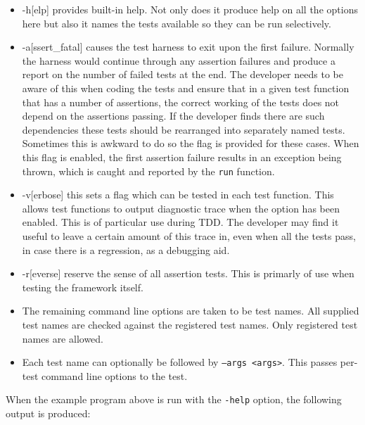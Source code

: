 \documentclass{book}
\begin{document}
\begin{itemize}
\item -h[elp]  provides built-in help. Not only does it produce
help on all the options here but also it names the tests available
so they can be run selectively.

\item -a[ssert\_fatal] causes the test harness to exit upon the first failure.
Normally the harness would continue through any assertion failures
and produce a report on the number of failed tests at the end.
The developer needs to be aware of this when coding the tests and ensure
that in a given test function that has a number of assertions,
the correct working of the tests does not depend on the assertions
passing. If the developer finds there are such dependencies these
tests should be rearranged into separately named tests.
Sometimes this is awkward to do so the flag is provided for these cases.
When this flag is enabled, the first assertion failure results in
an exception being thrown, which is caught and reported 
by the {\tt run} function.

\item -v[erbose] this sets a flag which can be tested in each test
function. This allows test functions to output diagnostic trace
when the option has been enabled. This is of particular use during
TDD. The developer may find it useful to leave a certain amount
of this trace in, even when all the tests pass, in case there
is a regression, as a debugging aid.

\item -r[everse] reserve the sense of all assertion tests.
This is primarly of use when testing the framework itself.

\item The remaining command line options are taken to be test names.
All supplied test names are checked against the registered test names.
Only registered test names are allowed.

\item Each test name can optionally be followed by {\tt --args <args>}.
This passes per-test command line options to the test.
\end{itemize}

When the example program above is run with the {\tt -help} option,
the following output is produced:
\end{document}
